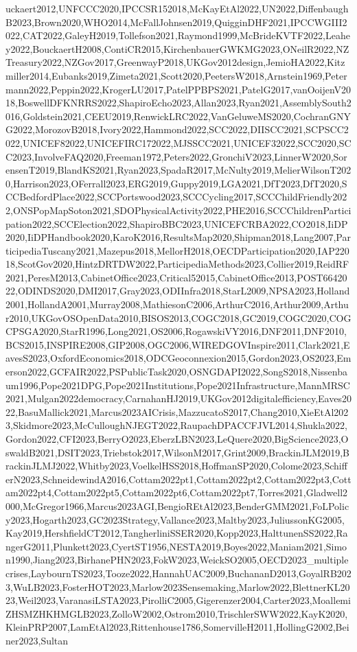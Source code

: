 \documentclass[a4paper]{article} %
\begin{document}
\begin{refsection}
uckaert2012,UNFCCC2020,IPCCSR152018,McKayEtAl2022,UN2022,DiffenbaughB2023,Brown2020,WHO2014,McFallJohnsen2019,QuigginDHF2021,IPCCWGIII2022,CAT2022,GaleyH2019,Tollefson2021,Raymond1999,McBrideKVTF2022,Leahey2022,BouckaertH2008,ContiCR2015,KirchenbauerGWKMG2023,ONeilR2022,NZTreasury2022,NZGov2017,GreenwayP2018,UKGov2012design,JemioHA2022,Kitzmiller2014,Eubanks2019,Zimeta2021,Scott2020,PeetersW2018,Arnstein1969,Petermann2022,Peppin2022,KrogerLU2017,PatelPPBPS2021,PatelG2017,vanOoijenV2018,BoswellDFKNRRS2022,ShapiroEcho2023,Allan2023,Ryan2021,AssemblySouth2016,Goldstein2021,CEEU2019,RenwickLRC2022,VanGeluweMS2020,CochranGNYG2022,MorozovB2018,Ivory2022,Hammond2022,SCC2022,DIISCC2021,SCPSCC2022,UNICEF82022,UNICEFIRC172022,MJSSCC2021,UNICEF32022,SCC2020,SCC2023,InvolveFAQ2020,Freeman1972,Peters2022,GronchiV2023,LinnerW2020,SorensenT2019,BlandKS2021,Ryan2023,SpadaR2017,McNulty2019,MelierWilsonT2020,Harrison2023,OFerrall2023,ERG2019,Guppy2019,LGA2021,DfT2023,DfT2020,SCCBedfordPlace2022,SCCPortswood2023,SCCCycling2017,SCCChildFriendly2022,ONSPopMapSoton2021,SDOPhysicalActivity2022,PHE2016,SCCChildrenParticipation2022,SCCElection2022,ShapiroBBC2023,UNICEFCRBA2022,CO2018,IiDP2020,IiDPHandbook2020,KaroK2016,ResultsMap2020,Shipman2018,Lang2007,ParticipediaTuscany2021,Mazepus2018,MellorH2018,OECDParticipation2020,IAP22018,ScotGov2020,HintzDRTDW2022,ParticipediaMethods2023,Collier2019,ReidRF2021,PeresM2013,CabinetOffice2023,Critical52015,CabinetOffice2013,POST6642022,ODINDS2020,DMI2017,Gray2023,ODIInfra2018,StarL2009,NPSA2023,Holland2001,HollandA2001,Murray2008,MathiesonC2006,ArthurC2016,Arthur2009,Arthur2010,UKGovOSOpenData2010,BISOS2013,COGC2018,GC2019,COGC2020,COGCPSGA2020,StarR1996,Long2021,OS2006,RogawskiVY2016,DNF2011,DNF2010,BCS2015,INSPIRE2008,GIP2008,OGC2006,WIREDGOVInspire2011,Clark2021,EavesS2023,OxfordEconomics2018,ODCGeoconnexion2015,Gordon2023,OS2023,Emerson2022,GCFAIR2022,PSPublicTask2020,OSNGDAPI2022,SongS2018,Nissenbaum1996,Pope2021DPG,Pope2021Institutions,Pope2021Infrastructure,MannMRSC2021,Mulgan2022democracy,CarnahanHJ2019,UKGov2012digitalefficiency,Eaves2022,BasuMallick2021,Marcus2023AICrisis,MazzucatoS2017,Chang2010,XieEtAl2023,Skidmore2023,McCulloughNJEGT2022,RaupachDPACCFJVL2014,Shukla2022,Gordon2022,CFI2023,BerryO2023,EberzLBN2023,LeQuere2020,BigScience2023,OswaldB2021,DSIT2023,Triebstok2017,WilsonM2017,Grint2009,BrackinJLM2019,BrackinJLMJ2022,Whitby2023,VoelkelHSS2018,HoffmanSP2020,Colome2023,SchifferN2023,SchneidewindA2016,Cottam2022pt1,Cottam2022pt2,Cottam2022pt3,Cottam2022pt4,Cottam2022pt5,Cottam2022pt6,Cottam2022pt7,Torres2021,Gladwell2000,McGregor1966,Marcus2023AGI,BengioREtAl2023,BenderGMM2021,FoLPolicy2023,Hogarth2023,GC2023Strategy,Vallance2023,Maltby2023,JuliussonKG2005,Kay2019,HershfieldCT2012,TangherliniSSER2020,Kopp2023,HalttunenSS2022,RangerG2011,Plunkett2023,CyertST1956,NESTA2019,Boyes2022,Maniam2021,Simon1990,Jiang2023,BirhanePHN2023,FokW2023,WeickSO2005,OECD2023_multiplecrises,LaybournTS2023,Tooze2022,HannahUAC2009,BuchananD2013,GoyalRB2023,WuLB2023,FosterHOT2023,Marlow2023Sensemaking,Marlow2022,BlettnerKL2023,Weil2023,VaranasiLSTA2023,PirolliC2005,Gigerenzer2004,Carter2023,MoallemiZHSMZHKHMGLB2023,ZolloW2002,Ostrom2010,TrischlerSWW2022,KayK2020,KleinPRP2007,LamEtAl2023,Rittenhouse1786,SomervilleH2011,HollingG2002,Beiner2023,Sultan
\end{refsection}
\end{document}
